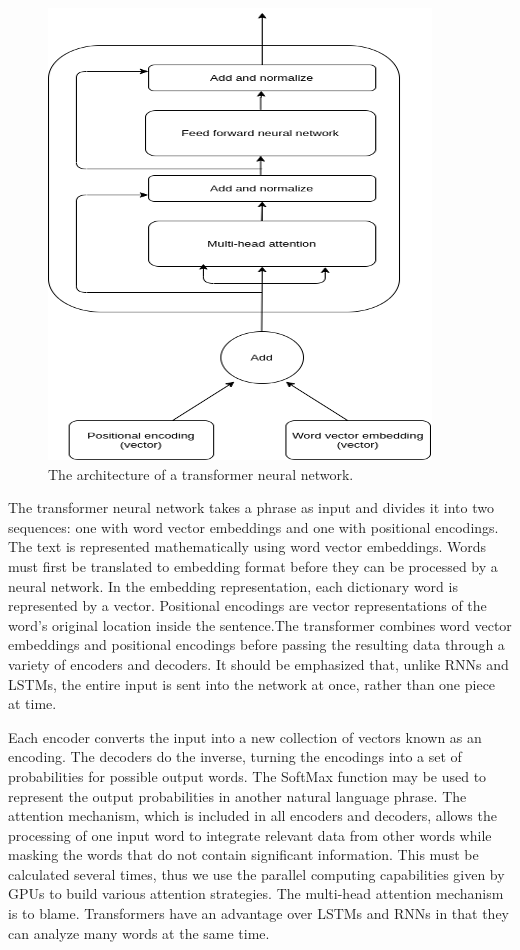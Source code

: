 \begin{figure}[ht]
    \centering
    \includegraphics[scale=0.7]{figures/Transformer.png}
    \caption{The architecture of a transformer neural network.}
    \label{fig:chart_a}
\end{figure}

The transformer neural network takes a phrase as input and divides it into two sequences: one with word vector embeddings and one with positional encodings. The text is represented mathematically using word vector embeddings. Words must first be translated to embedding format before they can be processed by a neural network. In the embedding representation, each dictionary word is represented by a vector. Positional encodings are vector representations of the word's original location inside the sentence.The transformer combines word vector embeddings and positional encodings before passing the resulting data through a variety of encoders and decoders. It should be emphasized that, unlike RNNs and LSTMs, the entire input is sent into the network at once, rather than one piece at time.

Each encoder converts the input into a new collection of vectors known as an encoding. The decoders do the inverse, turning the encodings into a set of probabilities for possible output words. The SoftMax function may be used to represent the output probabilities in another natural language phrase. The attention mechanism, which is included in all encoders and decoders, allows the processing of one input word to integrate relevant data from other words while masking the words that do not contain significant information. This must be calculated several times, thus we use the parallel computing capabilities given by GPUs to build various attention strategies. The multi-head attention mechanism is to blame. Transformers have an advantage over LSTMs and RNNs in that they can analyze many words at the same time.




